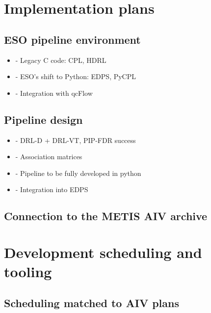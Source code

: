 \documentclass[]{spie}  %
\begin{document}
\section{Implementation plans}
\label{sec:implementation}

\subsection{ESO pipeline environment}
\label{ssec:imp_eso}

 \begin{itemize}
     \item - Legacy C code: CPL, HDRL
     \item - ESO's shift to Python: EDPS, PyCPL
     \item - Integration with qcFlow
 \end{itemize}

\subsection{Pipeline design}
\label{ssec:imp_pip}

 \begin{itemize}
     \item - DRL-D + DRL-VT, PIP-FDR success
     \item - Association matrices
     \item - Pipeline to be fully developed in python
     \item - Integration into EDPS
 \end{itemize}
 
\subsection{Connection to the METIS AIV archive}
\label{ssec:imp_archive}



\section{Development scheduling and tooling}
\label{sec:development}

\subsection{Scheduling matched to AIV plans}
\label{ssec:dev_aiv}
\end{document}
